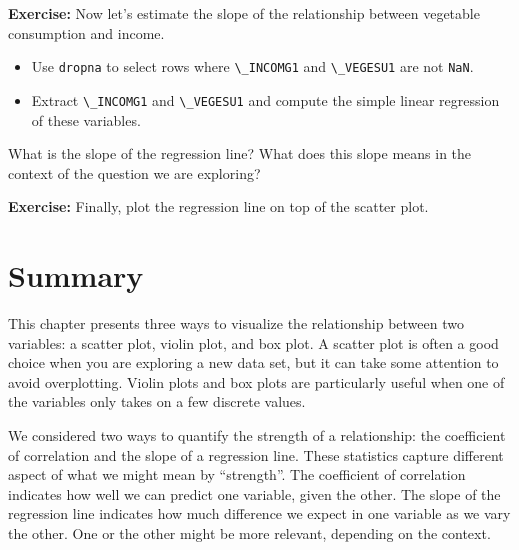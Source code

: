 \textbf{Exercise:} Now let's estimate the slope of the relationship
between vegetable consumption and income.

\begin{itemize}
\item
  Use \passthrough{\lstinline!dropna!} to select rows where
  \passthrough{\lstinline!\_INCOMG1!} and
  \passthrough{\lstinline!\_VEGESU1!} are not
  \passthrough{\lstinline!NaN!}.
\item
  Extract \passthrough{\lstinline!\_INCOMG1!} and
  \passthrough{\lstinline!\_VEGESU1!} and compute the simple linear
  regression of these variables.
\end{itemize}

What is the slope of the regression line? What does this slope means in
the context of the question we are exploring?

\textbf{Exercise:} Finally, plot the regression line on top of the
scatter plot.

\hypertarget{summary}{%
\section{Summary}\label{summary}}

This chapter presents three ways to visualize the relationship between
two variables: a scatter plot, violin plot, and box plot. A scatter plot
is often a good choice when you are exploring a new data set, but it can
take some attention to avoid overplotting. Violin plots and box plots
are particularly useful when one of the variables only takes on a few
discrete values.

We considered two ways to quantify the strength of a relationship: the
coefficient of correlation and the slope of a regression line. These
statistics capture different aspect of what we might mean by
``strength''. The coefficient of correlation indicates how well we can
predict one variable, given the other. The slope of the regression line
indicates how much difference we expect in one variable as we vary the
other. One or the other might be more relevant, depending on the
context.

